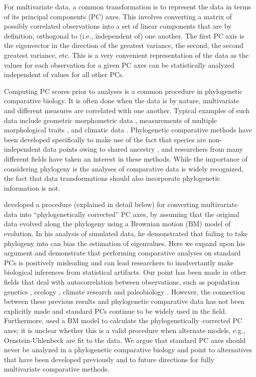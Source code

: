 \documentclass[a4paper,12pt]{article}
\begin{document}
For multivariate data, a common transformation is to represent the data in terms of its principal components (PC) axes. This involves converting a matrix of possibly correlated observations into a set of linear components that are by definition, orthogonal to (i.e., independent of) one another. The first PC axis is the eigenvector in the direction of the greatest variance, the second, the second greatest variance, etc. This is a very convenient representation of the data as the values for each observation for a given PC axes can be statistically analyzed independent of values for all other PCs. 

Computing PC scores prior to analyses is a common procedure in phylogenetic comparative biology. It is often done when the data is by nature, multivariate and different measures are correlated with one another. Typical examples of such data include geometric morphometric data \citep[e.g.,][]{Dornburg2011, Hunt2013}, measurements of multiple morphological traits \citep[e.g.,][]{Harmon2010, BergmannIrshick2012, Weir2012, Pienaar2013}, and climatic data \citep[e.g.,][]{KozakWiens2010, Schnitzler2012}. Phylogenetic comparative methods \citep[PCMs; recently reviewed by][]{PennellHarmon} have been developed specifically to make use of the fact that species are non-independent data points owing to shared ancestry \citep{Felsenstein1985}, and researchers from many different fields have taken an interest in these methods. While the importance of considering phylogeny is the analyses of comparative data is widely recognized, the fact that data transformations should also incorporate phylogenetic information is not.

\citet{Revell2008} developed a procedure (explained in detail below) for converting multivariate data into ``phylogenetically corrected'' PC axes, by assuming that the original data evolved along the phylogeny using a Brownian motion (BM) model of evolution. In his analysis of simulated data, he demonstrated that failing to take phylogeny into can bias the estimation of eigenvalues. Here we expand upon his argument and demonstrate that performing comparative analyses on standard PCs is positively misleading and can lead researchers to inadvertantly make biological inferences from statistical artifacts. Our point has been made in other fields that deal with autocorrelation between observations, such as population genetics \citep{Novembre}, ecology \citep{Podani2002}, climate research \citep{Richman1986} and paleobiology \citep{Bookstein2012}. However, the connection between these previous results and phylogenetic comparative data has not been explicitly made and standard PCs continue to be widely used in the field. Furthermore, \citet{Revell2008} used a BM model to calculate the phylogenetically--corrected PC axes; it is unclear whether this is a valid procedure when alternate models, e.g., Ornstein-Uhlenbeck \citep[OU;][]{Hansen1997} are fit to the data. We argue that standard PC axes should never be analyzed in a phylogenetic comparative biology and point to alternatives that have been developed previously and to future directions for fully multivariate comparative methods.
\end{document}
